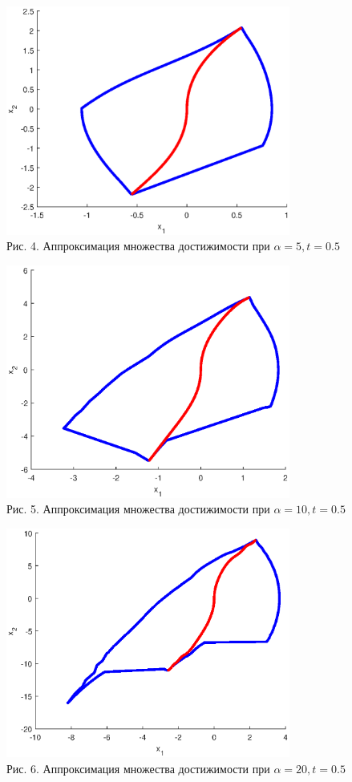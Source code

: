 \documentclass{article}
\theoremstyle{definition}
\begin{document}
	\begin{center}
		\includegraphics[width=0.7\textwidth]{example4.eps}\\
		{Рис. 4. Аппроксимация множества достижимости при $\alpha = 5, t = 0.5$ }
	\end{center}
	\begin{center}
		\includegraphics[width=0.7\textwidth]{example5.eps}\\
		{Рис. 5. Аппроксимация множества достижимости при $\alpha = 10, t = 0.5$ }
	\end{center}
	\begin{center}
		\includegraphics[width=0.7\textwidth]{example6.eps}\\
		{Рис. 6. Аппроксимация множества достижимости при $\alpha = 20, t = 0.5$ }
	\end{center}
\end{document}

